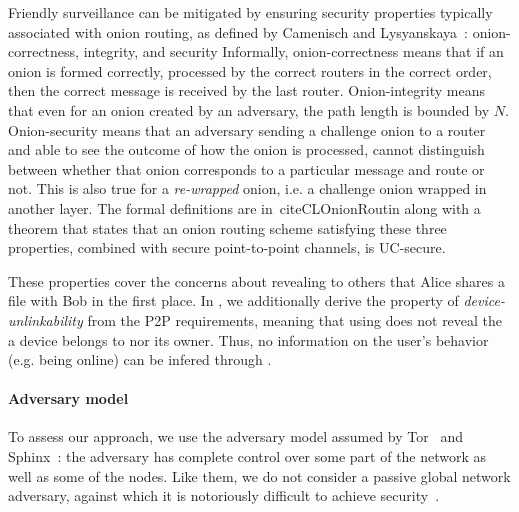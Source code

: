 Friendly surveillance can be mitigated by ensuring security properties 
typically associated with onion routing, as defined by Camenisch and Lysyanskaya~\cite{CLOnionRouting}: 
onion-correctness, integrity, and security %
Informally, onion-correctness means that if an onion is formed
correctly, processed by the correct routers in the correct order, then
the correct message is received by the last router. Onion-integrity
means that even for an onion created by an adversary, the path length
is bounded by $N$. Onion-security means that an adversary sending a
challenge onion to a router and able to see the outcome of how the
onion is processed, cannot distinguish between whether that onion
corresponds to a particular message and route or not. This is also
true for a \emph{re-wrapped} onion, i.e. a challenge onion wrapped in
another layer. The formal definitions are in~cite{CLOnionRoutin} along
with a theorem that states that an onion routing scheme satisfying
these three properties, combined with secure point-to-point channels,
is UC-secure.

These properties cover the concerns about
revealing to others that Alice shares a file with Bob in the first
place. In \name, we additionally derive the property of
\emph{device-unlinkability} from the \ac{P2P} requirements, meaning that
using \name does not reveal the \squad a device belongs to nor its
owner. Thus, no information on the user's behavior (e.g. being online)
can be infered through \name. 


  

\paragraph*{Adversary model} To assess our approach, we use the
adversary model assumed by Tor~\cite{Tor} and Sphinx~\cite{Sphinx}:
the adversary has complete control over some part of the network as
well as some of the nodes. Like them, we do not consider a passive global network
adversary, against which it is notoriously difficult to achieve
security~\cite{SystemsForAnonymousCommunication}.
